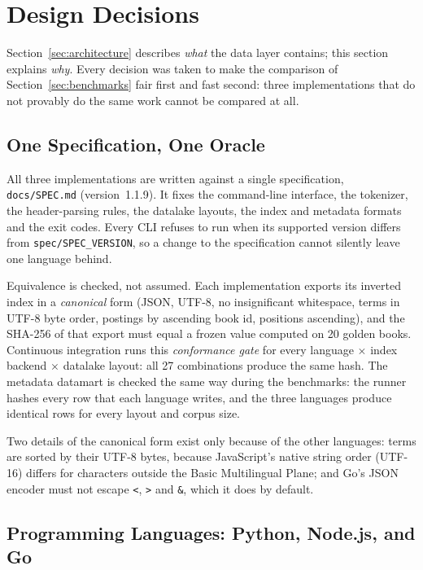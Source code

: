 \documentclass[12pt,a4paper]{article}
\begin{document}
	\section{Design Decisions}
	\label{sec:design}
	Section~\ref{sec:architecture} describes \emph{what} the data layer contains; this
	section explains \emph{why}. Every decision was taken to make the comparison of
	Section~\ref{sec:benchmarks} fair first and fast second: three implementations that do
	not provably do the same work cannot be compared at all.

	\subsection{One Specification, One Oracle}

	All three implementations are written against a single specification,
	\texttt{docs/SPEC.md} (version~1.1.9). It fixes the command-line interface, the
	tokenizer, the header-parsing rules, the datalake layouts, the index and metadata
	formats and the exit codes. Every CLI refuses to run when its supported version differs
	from \texttt{spec/SPEC\_VERSION}, so a change to the specification cannot silently leave
	one language behind.

	Equivalence is checked, not assumed. Each implementation exports its inverted index in a
	\emph{canonical} form (JSON, UTF-8, no insignificant whitespace, terms in UTF-8 byte
	order, postings by ascending book id, positions ascending), and the SHA-256 of that
	export must equal a frozen value computed on 20 golden books. Continuous integration
	runs this \emph{conformance gate} for every language $\times$ index backend $\times$
	datalake layout: all 27 combinations produce the same hash. The metadata datamart is
	checked the same way during the benchmarks: the runner hashes every row that each
	language writes, and the three languages produce identical rows for every layout and
	corpus size.

	Two details of the canonical form exist only because of the other languages: terms are
	sorted by their UTF-8 bytes, because JavaScript's native string order (UTF-16) differs
	for characters outside the Basic Multilingual Plane; and Go's JSON encoder must not
	escape \texttt{<}, \texttt{>} and \texttt{\&}, which it does by default.

	\subsection{Programming Languages: Python, Node.js, and Go}
\end{document}
